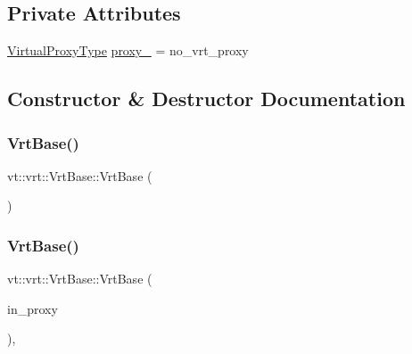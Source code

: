 \subsection*{Private Attributes}
\begin{DoxyCompactItemize}
\item 
\hyperlink{namespacevt_a1b417dd5d684f045bb58a0ede70045ac}{Virtual\+Proxy\+Type} \hyperlink{structvt_1_1vrt_1_1_vrt_base_a1904e5218715dc8f4ec7c186ce4ffee3}{proxy\+\_\+} = no\+\_\+vrt\+\_\+proxy
\end{DoxyCompactItemize}


\subsection{Constructor \& Destructor Documentation}
\mbox{\label{structvt_1_1vrt_1_1_vrt_base_a5f98da4f22c55e58f5759eb84ac7cd06}} 
\subsubsection{\texorpdfstring{Vrt\+Base()}{VrtBase()}\hspace{0.1cm}{\footnotesize\ttfamily [1/2]}}
{\footnotesize\ttfamily vt\+::vrt\+::\+Vrt\+Base\+::\+Vrt\+Base (\begin{DoxyParamCaption}{ }\end{DoxyParamCaption})\hspace{0.3cm}{\ttfamily [default]}}

\mbox{\label{structvt_1_1vrt_1_1_vrt_base_a7cc2b4f4ad3f2807e73b3d7a0a5b3676}} 
\subsubsection{\texorpdfstring{Vrt\+Base()}{VrtBase()}\hspace{0.1cm}{\footnotesize\ttfamily [2/2]}}
{\footnotesize\ttfamily vt\+::vrt\+::\+Vrt\+Base\+::\+Vrt\+Base (\begin{DoxyParamCaption}\item[{\hyperlink{namespacevt_a1b417dd5d684f045bb58a0ede70045ac}{Virtual\+Proxy\+Type} const \&}]{in\+\_\+proxy }\end{DoxyParamCaption})\hspace{0.3cm}{\ttfamily [inline]}, {\ttfamily [explicit]}}

